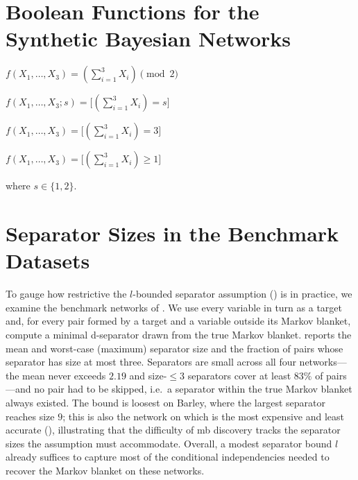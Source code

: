 



\section{Boolean Functions for the Synthetic Bayesian Networks}\label{apx:bool-func}
\begin{description}[align=right,labelwidth=7em]
\item[parity:]     
  $f(X_{1},\ldots,X_{3}) = (\sum_{i=1}^{3}X_{i}) \pmod{2}$
\item[ex-$s$:] 
  $f(X_{1},\ldots,X_{3}; s) = \bigl[(\sum_{i=1}^{3}X_{i}) = s\bigr]$
\item[and:]       
  $f(X_{1},\ldots,X_{3}) = \bigl[(\sum_{i=1}^{3}X_{i}) = 3\bigr]$
\item[or:]         
  $f(X_{1},\ldots,X_{3}) = \bigl[(\sum_{i=1}^{3}X_{i}) \geq 1\bigr]$
\end{description}
where $s\in\{1,2\}$.

\section{Separator Sizes in the Benchmark Datasets}\label{apx:dsep}
To gauge how restrictive the $l$-bounded separator assumption
() is in practice, we examine the benchmark networks
of . We use every variable in turn as a target and,
for every pair formed by a target and a variable outside its Markov
blanket, compute a minimal d-separator drawn from the true Markov
blanket.  reports the mean and worst-case (maximum)
separator size and the fraction of pairs whose separator has size at
most three. Separators are small across all four networks---the mean
never exceeds $2.19$ and size-$\leq\!3$ separators cover at least $83\%$
of pairs---and no pair had to be skipped, i.e.\ a separator within the
true Markov blanket always existed. The bound is loosest on Barley,
where the largest separator reaches size $9$; this is also the network
on which {\method} is the most expensive and least accurate
(), illustrating that the difficulty of \gls{mb}
discovery tracks the separator sizes the assumption must accommodate.
Overall, a modest separator bound $l$ already suffices to capture most
of the conditional independencies needed to recover the Markov blanket
on these networks.

